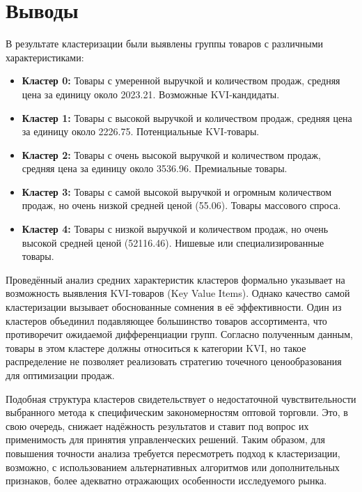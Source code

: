 \documentclass[12pt, a4paper]{article}
\begin{document}
\section{Выводы}
В результате кластеризации были выявлены группы товаров с различными характеристиками:

\begin{itemize}
    \item \textbf{Кластер 0:} Товары с умеренной выручкой и количеством продаж, средняя цена за единицу около \num{2023.21}. Возможные KVI-кандидаты.
    \item \textbf{Кластер 1:} Товары с высокой выручкой и количеством продаж, средняя цена за единицу около \num{2226.75}. Потенциальные KVI-товары.
    \item \textbf{Кластер 2:} Товары с очень высокой выручкой и количеством продаж, средняя цена за единицу около \num{3536.96}. Премиальные товары.
    \item \textbf{Кластер 3:} Товары с самой высокой выручкой и огромным количеством продаж, но очень низкой средней ценой (\num{55.06}). Товары массового спроса.
    \item \textbf{Кластер 4:} Товары с низкой выручкой и количеством продаж, но очень высокой средней ценой (\num{52116.46}). Нишевые или специализированные товары.
\end{itemize}


Проведённый анализ средних характеристик кластеров формально указывает на возможность выявления KVI-товаров (Key Value Items). Однако качество самой кластеризации вызывает обоснованные сомнения в её эффективности. Один из кластеров объединил подавляющее большинство товаров ассортимента, что противоречит ожидаемой дифференциации групп. Согласно полученным данным, товары в этом кластере должны относиться к категории KVI, но такое распределение не позволяет реализовать стратегию точечного ценообразования для оптимизации продаж.\par
Подобная структура кластеров свидетельствует о недостаточной чувствительности выбранного метода к специфическим закономерностям оптовой торговли. Это, в свою очередь, снижает надёжность результатов и ставит под вопрос их применимость для принятия управленческих решений. Таким образом, для повышения точности анализа требуется пересмотреть подход к кластеризации, возможно, с использованием альтернативных алгоритмов или дополнительных признаков, более адекватно отражающих особенности исследуемого рынка.
\end{document}
